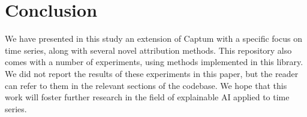 \section{Conclusion}
\label{sec:conclusion}

We have presented in this study \texttt{} an extension of Captum with a specific focus on
time series, along with several novel attribution methods.
This repository also comes with a number of experiments, using methods implemented in this library.
We did not report the results of these experiments in this paper, but the reader can refer to them in the relevant
sections of the codebase.
We hope that this work will foster further research in the field of explainable AI applied to time series.